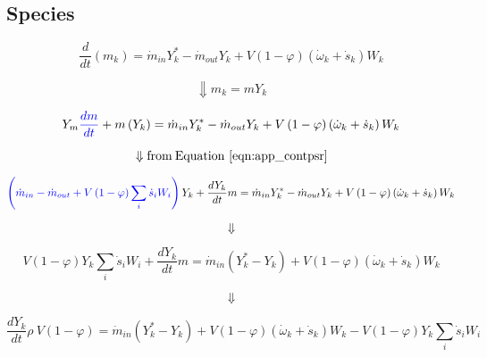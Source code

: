 \subsection{Species}


\begin{equation*}
	\frac{d}{dt}\left(m_k\right)={\dot{m}}_{in}Y_k^\ast-{\dot{m}}_{out}Y_k+V\left(1-\varphi\right)\left({\dot{\omega}}_k+{\dot{s}}_k\right)W_k
\end{equation*}

\begin{equation*}
	\Downarrow m_k=mY_k
\end{equation*}


\begin{equation*}
	Y_m
	\color{blue}
	\frac{dm}{dt}
	\color{black}
	+
	m\left(Y_k\right)
	=
	{\dot{m}}_{in}Y_k^\ast-{\dot{m}}_{out}Y_k+V\left(1-\varphi\right)\left({\dot{\omega}}_k+{\dot{s}}_k\right)W_k
\end{equation*}

\begin{equation*}
	\Downarrow \mathrm{from \: Equation~\ref{eqn:app_contpsr}}
\end{equation*}


\begin{equation*}
	\color{blue}
	\left(
		{\dot{m}}_{in}
		-
		{\dot{m}}_{out}
		+V\left(1-\varphi\right)\sum_{i}{{\dot{s}}_iW_i}
	\right)
	\color{black}
	Y_k+\frac{dY_k}{dt}m={\dot{m}}_{in}Y_k^\ast-{\dot{m}}_{out}Y_k+V\left(1-\varphi\right)\left({\dot{\omega}}_k+{\dot{s}}_k\right)W_k
\end{equation*}

 \begin{equation*}
 	\Downarrow
 \end{equation*}


\begin{equation*}
	V\left(1-\varphi\right)Y_k\sum_{i}{{\dot{s}}_iW_i}
	+
	\frac{dY_k}{dt}m=
	{\dot{m}}_{in}
	\left(
		Y_k^\ast - Y_k
	\right)
	+
	V\left(1-\varphi\right)\left({\dot{\omega}}_k+{\dot{s}}_k\right)W_k
\end{equation*}

\begin{equation*}
	\Downarrow
\end{equation*}

\begin{equation*}
	\frac{dY_k}{dt}\rho\ V\left(1-\varphi\right)={\dot{m}}_{in}\left(Y_k^\ast-Y_k\right)+V\left(1-\varphi\right)\left({\dot{\omega}}_k+{\dot{s}}_k\right)W_k-V\left(1-\varphi\right)Y_k\sum_{i}{{\dot{s}}_iW_i}
\end{equation*}

